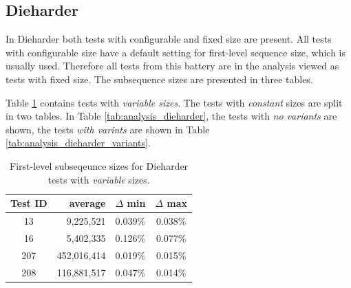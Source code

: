 \documentclass[
  digital,     %
  oneside,     %
  nosansbold,  %
  nocolorbold, %
  nolof,         %
  nolot,         %
]{fithesis4}
\begin{document}
\subsection{Dieharder}

In Dieharder both tests with configurable and fixed size are present. All tests with configurable size have a default setting for first-level sequence size, which is usually used. Therefore all tests from this battery are in the analysis viewed as tests with fixed size. The subsequence sizes are presented in three tables.

Table \ref{tab:analysis_dieharder_variable} contains tests with \emph{variable sizes}. The tests with \emph{constant} sizes are split in two tables. In Table \ref{tab:analysis_dieharder}, the tests with \emph{no variants} are shown, the tests \emph{with varints} are shown in Table \ref{tab:analysis_dieharder_variants}.

\begin{table}[H]
  \begin{tabularx}{0.7\textwidth}{c|r|c|c}
    Test ID & average & $\Delta$ min & $\Delta$ max\\
    \midrule
    13 & 9,225,521 & 0.039\% & 0.038\%\\
    16 & 5,402,335 & 0.126\% & 0.077\%\\
    207 & 452,016,414 & 0.019\% & 0.015\%\\
    208 & 116,881,517 & 0.047\% & 0.014\%\\
 
  \end{tabularx}
  \caption{First-level subseqeunce sizes for Dieharder tests with \emph{variable} sizes.}
  \label{tab:analysis_dieharder_variable}
\end{table}
\end{document}

